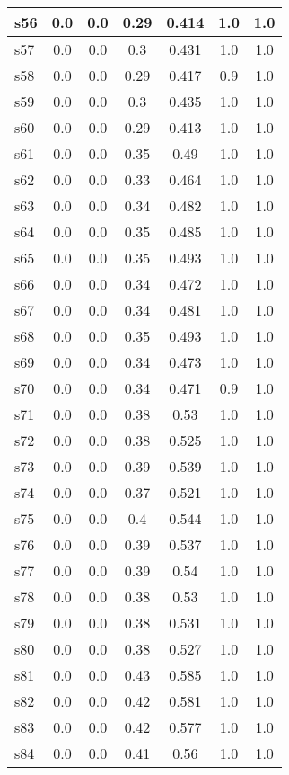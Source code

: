 \documentclass{article}
\begin{document}
\begin{tabular}{|l|c|c|c|c|c|c|}
\hline
s56 &0.0 & 0.0 & 0.29 & 0.414 & 1.0 & 1.0\\
\hline
s57 &0.0 & 0.0 & 0.3 & 0.431 & 1.0 & 1.0\\
\hline
s58 &0.0 & 0.0 & 0.29 & 0.417 & 0.9 & 1.0\\
\hline
s59 &0.0 & 0.0 & 0.3 & 0.435 & 1.0 & 1.0\\
\hline
s60 &0.0 & 0.0 & 0.29 & 0.413 & 1.0 & 1.0\\
\hline
s61 &0.0 & 0.0 & 0.35 & 0.49 & 1.0 & 1.0\\
\hline
s62 &0.0 & 0.0 & 0.33 & 0.464 & 1.0 & 1.0\\
\hline
s63 &0.0 & 0.0 & 0.34 & 0.482 & 1.0 & 1.0\\
\hline
s64 &0.0 & 0.0 & 0.35 & 0.485 & 1.0 & 1.0\\
\hline
s65 &0.0 & 0.0 & 0.35 & 0.493 & 1.0 & 1.0\\
\hline
s66 &0.0 & 0.0 & 0.34 & 0.472 & 1.0 & 1.0\\
\hline
s67 &0.0 & 0.0 & 0.34 & 0.481 & 1.0 & 1.0\\
\hline
s68 &0.0 & 0.0 & 0.35 & 0.493 & 1.0 & 1.0\\
\hline
s69 &0.0 & 0.0 & 0.34 & 0.473 & 1.0 & 1.0\\
\hline
s70 &0.0 & 0.0 & 0.34 & 0.471 & 0.9 & 1.0\\
\hline
s71 &0.0 & 0.0 & 0.38 & 0.53 & 1.0 & 1.0\\
\hline
s72 &0.0 & 0.0 & 0.38 & 0.525 & 1.0 & 1.0\\
\hline
s73 &0.0 & 0.0 & 0.39 & 0.539 & 1.0 & 1.0\\
\hline
s74 &0.0 & 0.0 & 0.37 & 0.521 & 1.0 & 1.0\\
\hline
s75 &0.0 & 0.0 & 0.4 & 0.544 & 1.0 & 1.0\\
\hline
s76 &0.0 & 0.0 & 0.39 & 0.537 & 1.0 & 1.0\\
\hline
s77 &0.0 & 0.0 & 0.39 & 0.54 & 1.0 & 1.0\\
\hline
s78 &0.0 & 0.0 & 0.38 & 0.53 & 1.0 & 1.0\\
\hline
s79 &0.0 & 0.0 & 0.38 & 0.531 & 1.0 & 1.0\\
\hline
s80 &0.0 & 0.0 & 0.38 & 0.527 & 1.0 & 1.0\\
\hline
s81 &0.0 & 0.0 & 0.43 & 0.585 & 1.0 & 1.0\\
\hline
s82 &0.0 & 0.0 & 0.42 & 0.581 & 1.0 & 1.0\\
\hline
s83 &0.0 & 0.0 & 0.42 & 0.577 & 1.0 & 1.0\\
\hline
s84 &0.0 & 0.0 & 0.41 & 0.56 & 1.0 & 1.0\\

\end{tabular}
\end{document}
